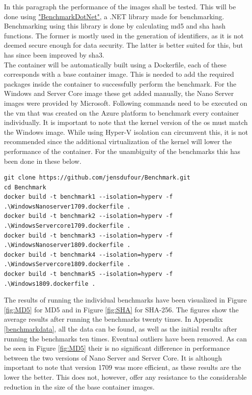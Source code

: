 In this paragraph the performance of the images shall be tested. This will be done using \href{https://benchmarkdotnet.org/}{"BenchmarkDotNet"}, a .NET library made for benchmarking. \autocite{Akinshin2019} Benchmarking using this library is done by calculating \acrfull{md5} and \acrfull{sha} hash functions. The former is mostly used in the generation of identifiers, as it is not deemed secure enough for data security. The latter is better suited for this, but has since been improved by \acrfull{sha3}. \autocite{Enkov2017}
\\
The container will be automatically built using a Dockerfile, each of these corresponds with a base container image. This is needed to add the required packages inside the container to successfully perform the benchmark. For the Windows and Server Core image these get added manually, the Nano Server images were provided by Microsoft. Following commands need to be executed on the \acrshort{vm} that was created on the Azure platform to benchmark every container individually. It is important to note that the kernel version of the \acrshort{os} must match the Windows image. While using Hyper-V isolation can circumvent this, it is not recommended since the additional virtualization of the kernel will lower the performance of the container. For the unambiguity of the benchmarks this has been done in these below.

\begin{lstlisting}[breaklines]
git clone https://github.com/jensdufour/Benchmark.git
cd Benchmark	
docker build -t benchmark1 --isolation=hyperv -f .\WindowsNanoserver1709.dockerfile .
docker build -t benchmark2 --isolation=hyperv -f .\WindowsServercore1709.dockerfile .
docker build -t benchmark3 --isolation=hyperv -f .\WindowsNanoserver1809.dockerfile .
docker build -t benchmark4 --isolation=hyperv -f .\WindowsServercore1809.dockerfile .
docker build -t benchmark5 --isolation=hyperv -f .\Windows1809.dockerfile .
\end{lstlisting}

The results of running the individual benchmarks have been visualized in Figure \ref{fig:MD5} for MD5 and in Figure \ref{fig:SHA} for SHA-256. The figures show the average results after running the benchmarks twenty times. In Appendix \ref{benchmarkdata}, all the data can be found, as well as the initial results after running the benchmarks ten times. Eventual outliers have been removed. 
As can be seen in Figure \ref{fig:MD5} their is no significant difference in performance between the two versions of Nano Server and Server Core. It is although important to note that version 1709 was more efficient, as these results are the lower the better. This does not, however, offer any resistance to the considerable reduction in the size of the base container images. 

